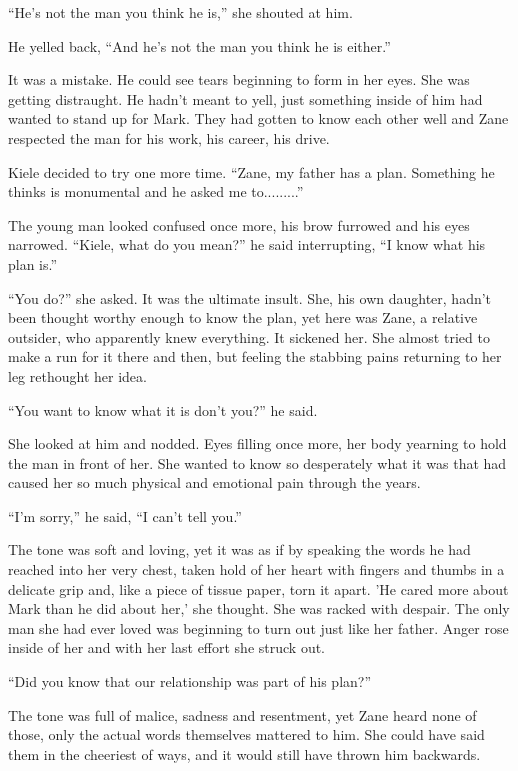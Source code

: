 ``He's not the man you think he is,'' she shouted at him.  

He yelled back, ``And he's not the man you think he is either.''

It was a mistake.  He could see tears beginning to form in her eyes.  She was getting distraught.  He hadn't meant to yell, just something inside of him had wanted to stand up for Mark.  They had gotten to know each other well and Zane respected the man for his work, his career, his drive.  

Kiele decided to try one more time.  ``Zane, my father has a plan.  Something he thinks is monumental and he asked me to.........''

The young man looked confused once more, his brow furrowed and his eyes narrowed.  ``Kiele, what do you mean?'' he said interrupting, ``I know what his plan is.''

``You do?'' she asked.  It was the ultimate insult.  She, his own daughter, hadn't been thought worthy enough to know the plan, yet here was Zane, a relative outsider, who apparently knew everything.  It sickened her.  She almost tried to make a run for it there and then, but feeling the stabbing pains returning to her leg rethought her idea.

``You want to know what it is don't you?'' he said.  

She looked at him and nodded.  Eyes filling once more, her body yearning to hold the man in front of her.  She wanted to know so desperately what it was that had caused her so much physical and emotional pain through the years.

``I'm sorry,'' he said, ``I can't tell you.''

The tone was soft and loving, yet it was as if by speaking the words he had reached into her very chest, taken hold of her heart with fingers and thumbs in a delicate grip and, like a piece of tissue paper, torn it apart.  'He cared more about Mark than he did about her,' she thought.  She was racked with despair.  The only man she had ever loved was beginning to turn out just like her father.  Anger rose inside of her and with her last effort she struck out.

``Did you know that our relationship was part of his plan?''

The tone was full of malice, sadness and resentment, yet Zane heard none of those, only the actual words themselves mattered to him.  She could have said them in the cheeriest of ways, and it would still have thrown him backwards.

